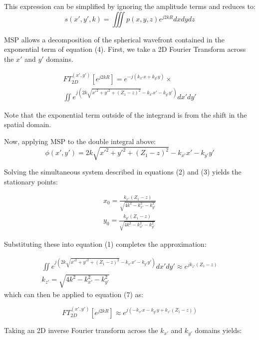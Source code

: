\documentclass{IEEEtran}
\begin{document}
This expression can be simplified by ignoring the amplitude terms and reduces to:
\begin{equation}
s(x',y',k) = \iiint{p(x,y,z)} e^{j2kR} dx dy dz
\end{equation}

MSP allows a decomposition of the spherical wavefront contained in the exponential term of equation (4). First, we take a 2D Fourier Transform across the $x'$ and $y'$ domains.

\begin{multline}
	FT_{2D}^{(x',y')}[e^{j2kR}] = e^{-j(k_{x'}x+k_{y'}y)} \times \\
	\iint e^{j(2k\sqrt{x'^2 + y'^2 + (Z_1 - z)^2} - k_{x'}x' - k_{y'}y' )} dx'dy'
\end{multline}

Note that the exponential term outside of the integrand is from the shift in the spatial domain.

Now, applying MSP to the double integral above:
\begin{equation}
	\phi(x',y') = 2k\sqrt{x'^2 + y'^2 + (Z_1 - z)^2} - k_{x'}x' - k_{y'}y'
\end{equation}

Solving the simultaneous system described in equations (2) and (3) yields the stationary points:

\begin{gather}
	x_0 = \frac{k_{x'}(Z_1 - z)}{\sqrt{4k^2 - k_{x'}^2 - k_{y'}^2}} \\
	y_0 = \frac{k_{y'}(Z_1 - z)}{\sqrt{4k^2 - k_{x'}^2 - k_{y'}^2}}
\end{gather}

Substituting these into equation (1) completes the approximation:

\begin{gather}
	\iint e^{j(2k\sqrt{x'^2 + y'^2 + (Z_1 - z)^2} - k_{x'}x' - k_{y'}y' )} dx'dy' \approx e^{jk_{z'}(Z_1 - z)} \\
	k_{z'} = \sqrt{4k^2 - k_{x'}^2 - k_{y'}^2}
\end{gather}
which can then be applied to equation (7) as:

\begin{equation}
FT_{2D}^{(x',y')}[e^{j2kR}] \approx e^{j(-k_{x'}x - k_{y'}y + k_{z'}(Z_1 - z) )}
\end{equation}

Taking an 2D inverse Fourier transform across the $k_{x'}$ and $k_{y'}$ domains yields:
\end{document}

